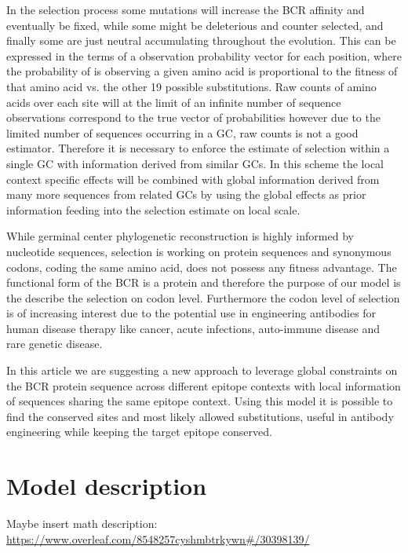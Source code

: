 In the selection process some mutations will increase the BCR affinity and eventually be fixed, while some might be deleterious and counter selected, and finally some are just neutral accumulating throughout the evolution.
This can be expressed in the terms of a observation probability vector for each position, where the probability of is observing a given amino acid is proportional to the fitness of that amino acid vs.
the other 19 possible substitutions.
Raw counts of amino acids over each site will at the limit of an infinite number of sequence observations correspond to the true vector of probabilities however due to the limited number of sequences occurring in a GC, raw counts is not a good estimator.
Therefore it is necessary to enforce the estimate of selection within a single GC with information derived from similar GCs.
In this scheme the local context specific effects will be combined with global information derived from many more sequences from related GCs by using the global effects as prior information feeding into the selection estimate on local scale.

While germinal center phylogenetic reconstruction is highly informed by nucleotide sequences, selection is working on protein sequences and synonymous codons, coding the same amino acid, does not possess any fitness advantage.
The functional form of the BCR is a protein and therefore the purpose of our model is the describe the selection on codon level.
Furthermore the codon level of selection is of increasing interest due to the potential use in engineering antibodies for human disease therapy like cancer, acute infections, auto-immune disease and rare genetic disease.

In this article we are suggesting a new approach to leverage global constraints on the BCR protein sequence across different epitope contexts with local information of sequences sharing the same epitope context.
Using this model it is possible to find the conserved sites and most likely allowed substitutions, useful in antibody engineering while keeping the target epitope conserved.






\section{Model description}
Maybe insert math description:
\url{https://www.overleaf.com/8548257cyshmbtrkywn#/30398139/}




